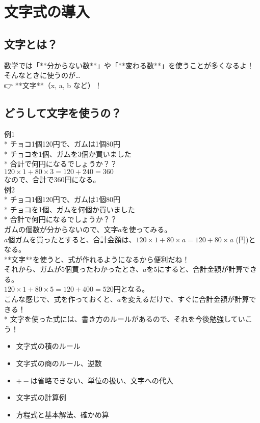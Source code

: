 ﻿\documentclass{jsarticle}
\begin{document}
\section{文字式の導入}


\subsection*{文字とは？}
数学では「**分からない数**」や「**変わる数**」を使うことが多くなるよ！\\

そんなときに使うのが…\\
👉 **文字**（x, a, b など）！


\subsection*{どうして文字を使うの？}

例1\\
* チョコ1個120円で、ガムは1個80円\\
* チョコを1個、ガムを3個か買いました\\
* 合計で何円になるでしょうか？？\\

$120 \times 1 + 80 \times 3 = 120 + 240 =360$\\
なので、合計で360円になる。\\

例2\\
* チョコ1個120円で、ガムは1個80円\\
* チョコを1個、ガムを何個か買いました\\
* 合計で何円になるでしょうか？？\\

ガムの個数が分からないので、文字$a$を使ってみる。\\
$a$個ガムを買ったとすると、合計金額は、$120 \times 1 + 80 \times a =120 + 80 \times a$ (円)となる。\\
**文字**を使うと、式が作れるようになるから便利だね！\\

それから、ガムが5個買ったわかったとき、$a$を5にすると、合計金額が計算できる。\\
$120 \times 1 + 80 \times 5 =120 + 400 = 520$円となる。\\

こんな感じで、式を作っておくと、$a$を変えるだけで、すぐに合計金額が計算できる！\\


* 文字を使った式には、書き方のルールがあるので、それを今後勉強していこう！\\


\begin{itemize}
\item 文字式の積のルール
\item 文字式の商のルール、逆数
\item $+-$は省略できない、単位の扱い、文字への代入
\item 文字式の計算例
\item 方程式と基本解法、確かめ算
\end{itemize}
\end{document}
